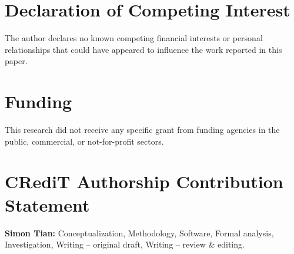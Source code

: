 \documentclass[11pt]{article}
\begin{document}
\section*{Declaration of Competing Interest}

The author declares no known competing financial interests or personal
relationships that could have appeared to influence the work reported in this
paper.

\section*{Funding}

This research did not receive any specific grant from funding agencies in the
public, commercial, or not-for-profit sectors.

\section*{CRediT Authorship Contribution Statement}

\textbf{Simon Tian:} Conceptualization, Methodology, Software, Formal
analysis, Investigation, Writing -- original draft, Writing -- review \&
editing.



\end{document}

